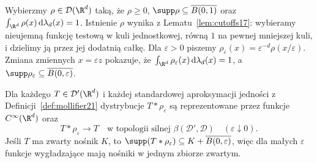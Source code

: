 \begin{definicja}
\label{def:mollifier21}
Wybierzmy $\rho\in\mathcal D(\R^d)$ taką, że
$\rho\ge0$, $\supp\rho\subseteq\overline{B(0,1)}$
oraz $\int_{\R^d}\rho(x)\,\mathrm d\lambda_d(x)=1$.
Istnienie $\rho$ wynika z Lematu~\ref{lem:cutoffs17}:
wybieramy nieujemną funkcję testową w kuli jednostkowej,
równą $1$ na pewnej mniejszej kuli, i dzielimy ją przez
jej dodatnią całkę. Dla $\varepsilon>0$ piszemy
$\rho_\varepsilon(x)=\varepsilon^{-d}\rho(x/\varepsilon)$.
Zmiana zmiennych $x=\varepsilon z$ pokazuje, że
$\int_{\R^d}\rho_\varepsilon(x)\,\mathrm d\lambda_d(x)=1$,
a $\supp\rho_\varepsilon\subseteq\overline{B(0,\varepsilon)}$.
\end{definicja}

\begin{twierdzenie}
\label{thm:strong-mollification21}
Dla każdego $T\in\mathcal D'(\R^d)$ i każdej
standardowej aproksymacji jedności z
Definicji~\ref{def:mollifier21} dystrybucje
$T*\rho_\varepsilon$ są reprezentowane przez funkcje
$C^\infty(\R^d)$ oraz
\[
 T*\rho_\varepsilon\longrightarrow T
 \quad\text{w topologii silnej }\beta(\mathcal D',\mathcal D)
 \quad(\varepsilon\downarrow0).
\]
Jeśli $T$ ma zwarty nośnik $K$, to
$\supp(T*\rho_\varepsilon)\subseteq K+
\overline{B(0,\varepsilon)}$, więc dla małych
$\varepsilon$ funkcje wygładzające mają nośniki
w jednym zbiorze zwartym.
\end{twierdzenie}
